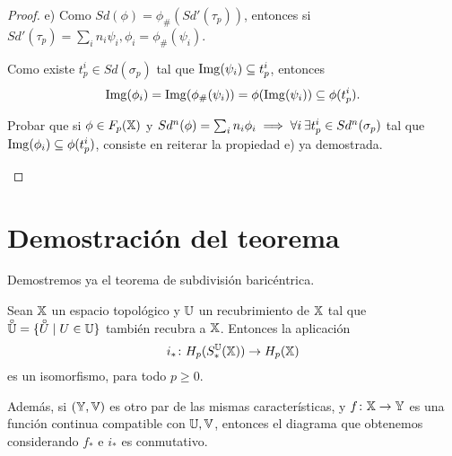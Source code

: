 \begin{proof}
  e) Como $Sd(\phi) = \phi_\#(Sd'(\tau_p))$, entonces si $Sd'(\tau_p) = \sum_i n_i \psi_i, \phi_i = \phi_\#(\psi_i)$.

  Como existe $t_p^i \in Sd(\sigma_p)$ tal que $\operatorname{Img}(\psi_i) \subseteq t_p^i$, entonces
  \[\operatorname{Img}(\phi_i) = \operatorname{Img}(\phi_\#(\psi_i)) = \phi(\operatorname{Img}(\psi_i)) \subseteq \phi(t_p^i).\]

  \begin{remark}
    Probar que si $\phi \in F_p({\mathbb X})$ y $Sd^n(\phi) = \sum_i n_i \phi_i \implies \forall i \hspace{0.2em} \exists t_p^i \in Sd^n(\sigma_p)$ tal que
    $\operatorname{Img}(\phi_i) \subseteq \phi(t_p^i)$, consiste en reiterar la propiedad e) ya demostrada.
  \end{remark}

\end{proof}

\section{Demostración del teorema}

Demostremos ya el teorema de subdivisión baricéntrica.

\begin{theorem}
  Sean ${\mathbb X}$ un espacio topológico y ${\mathbb U}$ un recubrimiento de ${\mathbb X}$ tal que $\interior{\U} = \{\interior{U} \mid U \in \U\}$
  también recubra a ${\mathbb X}$. Entonces la aplicación
  \[ i_* \colon H_p(S_*^{\mathbb U}({\mathbb X})) \to H_p({\mathbb X}) \]
  es un isomorfismo, para todo $p \geq 0$.

  Además, si $({\mathbb Y}, {\mathbb V})$ es otro par de las mismas características, y $f \colon {\mathbb X} \to {\mathbb Y}$ es una función continua
  compatible con ${\mathbb U}, {\mathbb V}$, entonces el diagrama que obtenemos considerando $f_*$ e $i_*$ es conmutativo.
\end{theorem}


